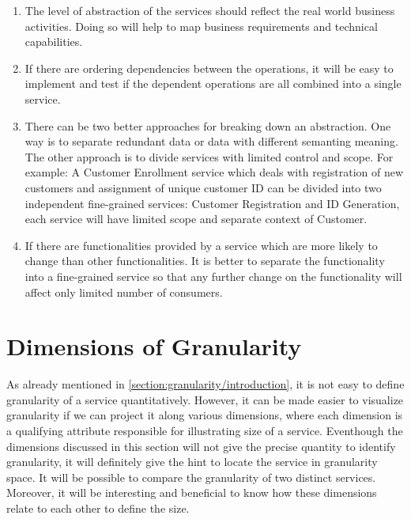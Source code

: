 \begin{enumerate}
\item The level of abstraction of the services should reflect the real world business activities. Doing so will help to map business requirements and technical capabilities. \cite{Pierre-Reldin:2007aa}

\item If there are ordering dependencies between the operations, it will be easy to implement and test if the dependent operations are all combined into a single service. \cite{Bianco:2007aa}

\item There can be two better approaches for breaking down an abstraction. One way is to separate redundant data or data with different semanting meaning. The other approach is to divide services with limited control and scope. For example: A Customer Enrollment service which deals with registration of new customers and assignment of unique customer ID can be divided into two independent fine-grained services: Customer Registration and ID Generation, each service will have limited scope and separate context of Customer.\cite{Pierre-Reldin:2007aa}

\item If there are functionalities provided by a service which are more likely to change than other functionalities. It is better to separate the functionality into a fine-grained service so that any further change on the functionality will affect only limited number of consumers. \cite{Bianco:2007aa}
 
\end{enumerate}

\section{Dimensions of Granularity}\label{section:granularity/dimensions}
As already mentioned in \ref{section:granularity/introduction}, it is not easy to define granularity of a service quantitatively. However, it can be made easier to visualize granularity if we can project it along various dimensions, where each dimension is a qualifying attribute responsible for illustrating size of a service. Eventhough the  dimensions discussed in this section will not give the precise quantity to identify granularity, it will definitely give the hint to locate the service in granularity space. It will be possible to compare the granularity of two distinct services. Moreover, it will be interesting and beneficial to know how these dimensions relate to each other to define the size.

